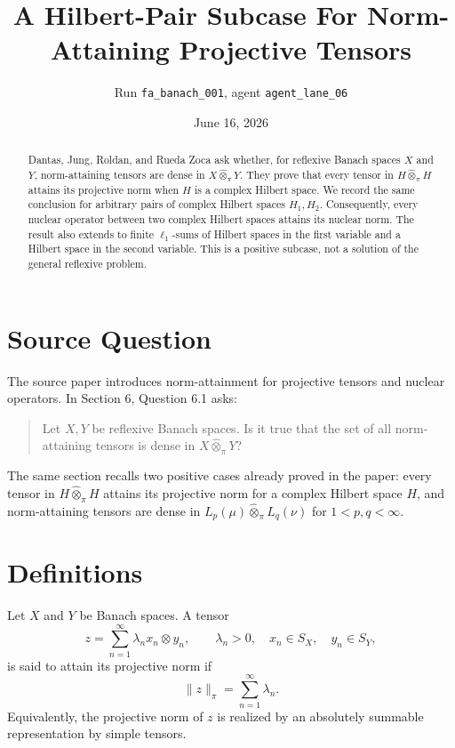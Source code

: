 \documentclass[11pt]{article}
\title{A Hilbert-Pair Subcase For Norm-Attaining Projective Tensors}
\author{Run \texttt{fa\_banach\_001}, agent \texttt{agent\_lane\_06}}
\date{June 16, 2026}
\theoremstyle{remark}
\begin{document}
\maketitle

\begin{abstract}
Dantas, Jung, Roldan, and Rueda Zoca ask whether, for reflexive Banach spaces
\(X\) and \(Y\), norm-attaining tensors are dense in
\(X\widehat\otimes_\pi Y\).  They prove that every tensor in
\(H\widehat\otimes_\pi H\) attains its projective norm when \(H\) is a complex
Hilbert space.  We record the same conclusion for arbitrary pairs of complex
Hilbert spaces \(H_1,H_2\).  Consequently, every nuclear operator between two
complex Hilbert spaces attains its nuclear norm.  The result also extends to
finite \(\ell_1\)-sums of Hilbert spaces in the first variable and a Hilbert
space in the second variable.  This is a positive subcase, not a solution of
the general reflexive problem.
\end{abstract}

\section{Source Question}

The source paper introduces norm-attainment for projective tensors and nuclear
operators.  In Section 6, Question 6.1 asks:
\begin{quote}
Let \(X,Y\) be reflexive Banach spaces. Is it true that the set of all
norm-attaining tensors is dense in \(X\widehat\otimes_\pi Y\)?
\end{quote}

The same section recalls two positive cases already proved in the paper:
every tensor in \(H\widehat\otimes_\pi H\) attains its projective norm for a
complex Hilbert space \(H\), and norm-attaining tensors are dense in
\(L_p(\mu)\widehat\otimes_\pi L_q(\nu)\) for \(1<p,q<\infty\).

\section{Definitions}

Let \(X\) and \(Y\) be Banach spaces.  A tensor
\[
  z=\sum_{n=1}^\infty \lambda_n x_n\otimes y_n,
  \qquad \lambda_n>0,\quad x_n\in S_X,\quad y_n\in S_Y,
\]
is said to attain its projective norm if
\[
  \|z\|_\pi=\sum_{n=1}^\infty \lambda_n.
\]
Equivalently, the projective norm of \(z\) is realized by an absolutely
summable representation by simple tensors.
\end{document}
